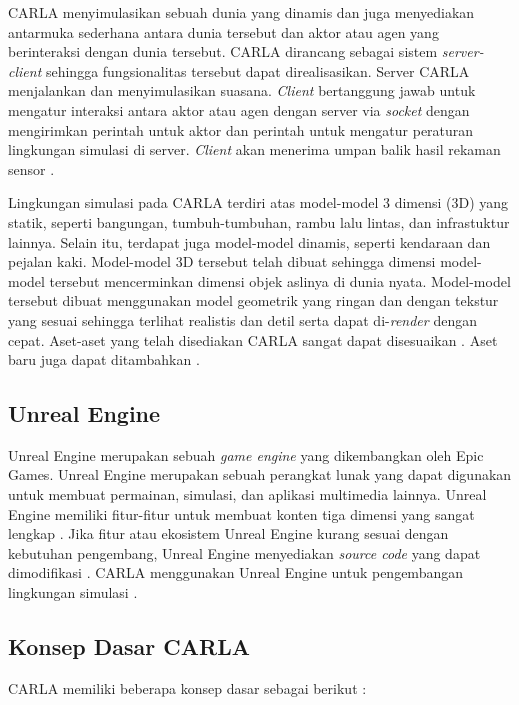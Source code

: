 CARLA menyimulasikan sebuah dunia yang dinamis dan juga menyediakan antarmuka
sederhana antara dunia tersebut dan aktor atau agen yang berinteraksi dengan
dunia tersebut. CARLA dirancang sebagai sistem \textit{server-client} sehingga
fungsionalitas tersebut dapat direalisasikan. Server CARLA menjalankan dan
menyimulasikan suasana. \textit{Client} bertanggung jawab untuk mengatur
interaksi antara aktor atau agen dengan server via \textit{socket} dengan
mengirimkan perintah untuk aktor dan perintah untuk mengatur peraturan
lingkungan simulasi di server. \textit{Client} akan menerima umpan balik hasil
rekaman sensor \parencite{carla-dosovitskiy}.

Lingkungan simulasi pada CARLA terdiri atas model-model 3 dimensi (3D) yang
statik, seperti bangungan, tumbuh-tumbuhan, rambu lalu lintas, dan infrastuktur
lainnya. Selain itu, terdapat juga model-model dinamis, seperti kendaraan dan
pejalan kaki. Model-model 3D tersebut telah dibuat sehingga dimensi model-model
tersebut mencerminkan dimensi objek aslinya di dunia nyata. Model-model tersebut
dibuat menggunakan model geometrik yang ringan dan dengan tekstur yang sesuai
sehingga terlihat realistis dan detil serta dapat di-\textit{render} dengan
cepat. Aset-aset yang telah disediakan CARLA sangat dapat disesuaikan
\parencite{carla-dosovitskiy}. Aset baru juga dapat ditambahkan
\parencite{carla-documentation-intro}.

\subsection{Unreal Engine}

Unreal Engine merupakan sebuah \textit{game engine} yang dikembangkan oleh Epic
Games. Unreal Engine merupakan sebuah perangkat lunak yang dapat digunakan untuk
membuat permainan, simulasi, dan aplikasi multimedia lainnya. Unreal Engine
memiliki fitur-fitur untuk membuat konten tiga dimensi yang sangat lengkap
\parencite{ue-5}. Jika fitur atau ekosistem Unreal Engine kurang sesuai dengan
kebutuhan pengembang, Unreal Engine menyediakan \textit{source code} yang dapat
dimodifikasi \parencite{ue-4}. CARLA menggunakan Unreal Engine untuk
pengembangan lingkungan simulasi \parencite{carla-documentation-build}.

\subsection{Konsep Dasar CARLA}

CARLA memiliki beberapa konsep dasar sebagai berikut
\parencite{carla-documentation-core-concepts}:

